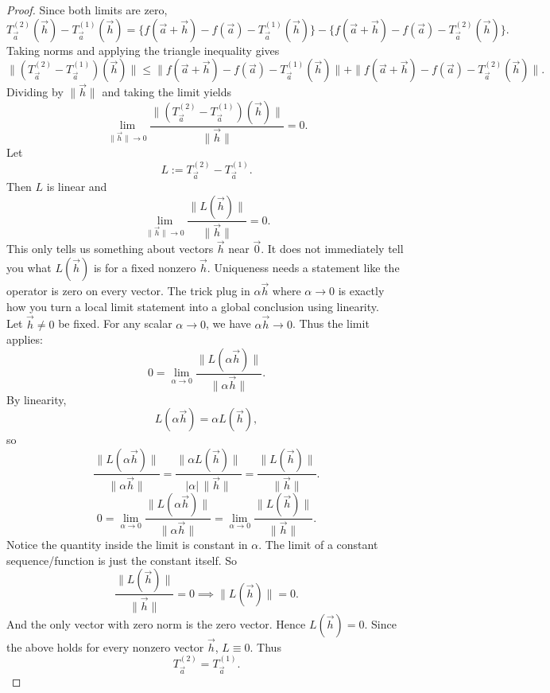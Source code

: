 \begin{proof}
Since both limits are zero,
\[
T_{\vec a}^{(2)}(\vec h)-T_{\vec a}^{(1)}(\vec h)
=
\{f(\vec a+\vec h)-f(\vec a)-T_{\vec a}^{(1)}(\vec h)\}
-
\{f(\vec a+\vec h)-f(\vec a)-T_{\vec a}^{(2)}(\vec h)\}.
\]
Taking norms and applying the triangle inequality gives
\[
\|(T_{\vec a}^{(2)}-T_{\vec a}^{(1)})(\vec h)\|
\le
\|f(\vec a+\vec h)-f(\vec a)-T_{\vec a}^{(1)}(\vec h)\|
+
\|f(\vec a+\vec h)-f(\vec a)-T_{\vec a}^{(2)}(\vec h)\|.
\]
Dividing by $\|\vec h\|$ and taking the limit yields
\[
\lim_{\|\vec h\|\to 0}
\frac{
\|(T_{\vec a}^{(2)}-T_{\vec a}^{(1)})(\vec h)\|
}{
\|\vec h\|
}
=0.
\]
Let
\[
L := T_{\vec a}^{(2)}-T_{\vec a}^{(1)}.
\]
Then $L$ is linear and
\[
\lim_{\|\vec h\|\to 0}
\frac{\|L(\vec h)\|}{\|\vec h\|}=0.
\]
This only tells us something about vectors $\vec h$ near $\vec 0$.
It does not immediately tell you what $L(\vec h)$ is for a fixed nonzero $\vec h$. Uniqueness needs a statement like the operator is zero on every vector.
The trick plug in $\alpha \vec h$ where $\alpha \to 0$ is exactly how you turn a local limit statement into a global conclusion using linearity.\\
Let $\vec h \neq 0$ be fixed.
For any scalar $\alpha \to 0$, we have $\alpha \vec h \to 0$.
Thus the limit applies:
\[
0=
\lim_{\alpha\to 0}
\frac{
\|L(\alpha \vec h)\|
}{
\|\alpha \vec h\|
}.
\]
By linearity,
\[
L(\alpha \vec h)=\alpha L(\vec h),
\]
so
\[
\frac{
\|L(\alpha \vec h)\|
}{
\|\alpha \vec h\|
}
=
\frac{
\|\alpha L(\vec h)\|
}{
|\alpha|\,\|\vec h\|
}
=
\frac{
\|L(\vec h)\|
}{
\|\vec h\|
}.
\]
\[
0=
\lim_{\alpha\to 0}
\frac{\|L(\alpha \vec h)\|}{\|\alpha \vec h\|}
=
\lim_{\alpha\to 0}
\frac{\|L(\vec h)\|}{\|\vec h\|}.
\]
Notice the quantity inside the limit is constant in $\alpha$.
The limit of a constant sequence/function is just the constant itself. So
\[
\frac{\|L(\vec h)\|}{\|\vec h\|}=0 \implies \|L(\vec h)\|=0.
\]
And the only vector with zero norm is the zero vector. Hence $L(\vec h)=0$.
Since the above holds for every nonzero vector $\vec h$, $L \equiv 0$.
Thus
\[
T_{\vec a}^{(2)}=T_{\vec a}^{(1)}.
\]
\end{proof}

